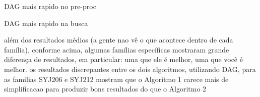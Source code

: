 DAG mais rapido no pre-proc

DAG mais rapido na busca



além dos resultados médios (a gente nao vê o que acontece dentro de cada família), conforme acima, algumas famílias específicas mostraram grande diferença de resultados, em particular: uma que ele é melhor, uma que você é melhor. os resultados discrepantes entre os dois algoritmos, utilizando DAG, para as familias SYJ206 e SYJ212 mostram que o Algoritmo 1 carece mais de simplificacao para produzir bons resultados do que o Algoritmo 2





